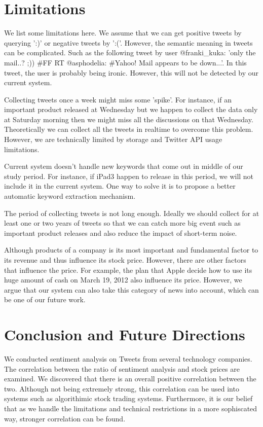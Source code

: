 \documentclass[12pt]{article}
\begin{document}
\section{Limitations}
We list some limitations here. We assume that we can get positive tweets by querying ':)' or negative tweets by ':('. However, the semantic meaning in tweets can be complicated. Such as the following tweet by user @franki\_kuka: 'only the mail..? ;)) \#FF RT @asphodelia: \#Yahoo! Mail appears to be down...'. In this tweet, the user is probably being ironic. However, this will not be detected by our current system.

Collecting tweets once a week might miss some 'spike'. For instance, if an important product released at Wednesday but we happen to collect the data only at Saturday morning then we might miss all the discussions on that Wednesday. Theoretically we can collect all the tweets in realtime to overcome this problem. However, we are technically limited by storage and Twitter API usage limitations.

Current system doesn't handle new keywords that come out in middle of our study period. For instance, if iPad3 happen to release in this period, we will not include it in the current system. One way to solve it is to propose a better automatic keyword extraction mechanism.

The period of collecting tweets is not long enough. Ideally we should collect for at least one or two years of tweets so that we can catch more big event such as important product releases and also reduce the impact of short-term noise.

Although products of a company is its most important and fundamental factor to its revenue and thus influence its stock price. However, there are other factors that influence the price. For example, the plan that Apple decide how to use its huge amount of cash on March 19, 2012 also influence its price. However, we argue that our system can also take this category of news into account, which can be one of our future work.

\section{Conclusion and Future Directions}

We conducted sentiment analysis on Tweets from several technology companies. The correlation between the ratio of sentiment analysis and stock prices are examined. We discovered that there is an overall positive correlation between the two. Although not being extremely strong, this correlation can be used into systems such as algorithimic stock trading systems. Furthermore, it is our belief that as we handle the limitations and technical restrictions in a more sophiscated way, stronger correlation can be found.
\end{document}
